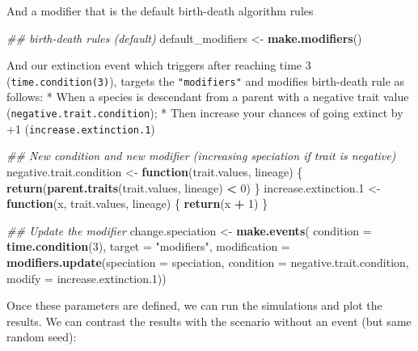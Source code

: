 \documentclass[
]{book}
\newenvironment{Shaded}{\begin{snugshade}}{\end{snugshade}}
\newcommand{\CommentTok}[1]{\textcolor[rgb]{0.56,0.35,0.01}{\textit{#1}}}
\newcommand{\ControlFlowTok}[1]{\textcolor[rgb]{0.13,0.29,0.53}{\textbf{#1}}}
\newcommand{\DataTypeTok}[1]{\textcolor[rgb]{0.13,0.29,0.53}{#1}}
\newcommand{\DecValTok}[1]{\textcolor[rgb]{0.00,0.00,0.81}{#1}}
\newcommand{\FloatTok}[1]{\textcolor[rgb]{0.00,0.00,0.81}{#1}}
\newcommand{\KeywordTok}[1]{\textcolor[rgb]{0.13,0.29,0.53}{\textbf{#1}}}
\newcommand{\NormalTok}[1]{#1}
\newcommand{\OperatorTok}[1]{\textcolor[rgb]{0.81,0.36,0.00}{\textbf{#1}}}
\newcommand{\StringTok}[1]{\textcolor[rgb]{0.31,0.60,0.02}{#1}}
\begin{document}
And a modifier that is the default birth-death algorithm rules

\begin{Shaded}
\begin{Highlighting}[]
\CommentTok{\#\# birth{-}death rules (default)}
\NormalTok{default\_modifiers \textless{}{-}}\StringTok{ }\KeywordTok{make.modifiers}\NormalTok{()}
\end{Highlighting}
\end{Shaded}

And our extinction event which triggers after reaching time 3 (\texttt{time.condition(3)}), targets the \texttt{"modifiers"} and modifies birth-death rule as follows:
* When a species is descendant from a parent with a negative trait value (\texttt{negative.trait.condition});
* Then increase your chances of going extinct by +1 (\texttt{increase.extinction.1})

\begin{Shaded}
\begin{Highlighting}[]
\CommentTok{\#\# New condition and new modifier (increasing speciation if trait is negative)}
\NormalTok{negative.trait.condition \textless{}{-}}\StringTok{ }\ControlFlowTok{function}\NormalTok{(trait.values, lineage) \{}
    \KeywordTok{return}\NormalTok{(}\KeywordTok{parent.traits}\NormalTok{(trait.values, lineage) }\OperatorTok{\textless{}}\StringTok{ }\DecValTok{0}\NormalTok{)}
\NormalTok{\}}
\NormalTok{increase.extinction}\FloatTok{.1}\NormalTok{ \textless{}{-}}\StringTok{ }\ControlFlowTok{function}\NormalTok{(x, trait.values, lineage) \{}
  \KeywordTok{return}\NormalTok{(x }\OperatorTok{+}\StringTok{ }\DecValTok{1}\NormalTok{)}
\NormalTok{\}}

\CommentTok{\#\# Update the modifier}
\NormalTok{change.speciation \textless{}{-}}\StringTok{ }\KeywordTok{make.events}\NormalTok{(}
    \DataTypeTok{condition    =} \KeywordTok{time.condition}\NormalTok{(}\DecValTok{3}\NormalTok{),}
    \DataTypeTok{target       =} \StringTok{"modifiers"}\NormalTok{,}
    \DataTypeTok{modification =} \KeywordTok{modifiers.update}\NormalTok{(}\DataTypeTok{speciation =}\NormalTok{ speciation,}
                                    \DataTypeTok{condition  =}\NormalTok{ negative.trait.condition,}
                                    \DataTypeTok{modify     =}\NormalTok{ increase.extinction}\FloatTok{.1}\NormalTok{))}
\end{Highlighting}
\end{Shaded}

Once these parameters are defined, we can run the simulations and plot the results.
We can contrast the results with the scenario without an event (but same random seed):
\end{document}
